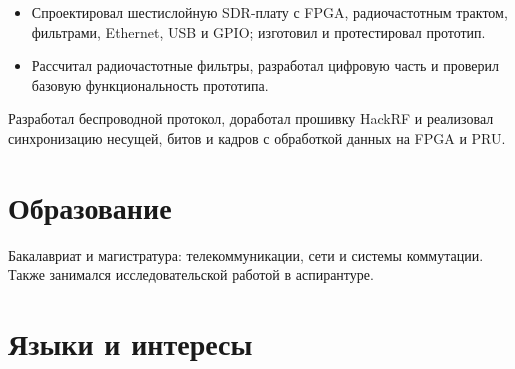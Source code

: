 \documentclass[10pt,a4paper]{article}
\begin{document}
\begin{itemize}
  \item Спроектировал шестислойную SDR-плату с FPGA, радиочастотным трактом,
    фильтрами, Ethernet, USB и GPIO; изготовил и протестировал прототип.
  \item Рассчитал радиочастотные фильтры, разработал цифровую часть
    и проверил базовую функциональность прототипа.
\end{itemize}

Разработал беспроводной протокол, доработал прошивку HackRF и реализовал
синхронизацию несущей, битов и кадров с обработкой данных на FPGA и PRU.

\section*{Образование}
Бакалавриат и магистратура: телекоммуникации, сети и системы коммутации.
Также занимался исследовательской работой в аспирантуре.

\section*{Языки и интересы}
\end{document}
